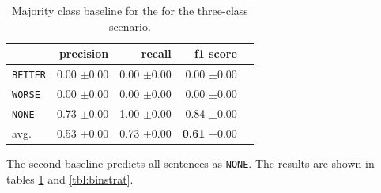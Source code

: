 \begin{table}[!htb]
\begin{minipage}{.5\linewidth}
	\end{minipage}%
	\begin{minipage}{.5\linewidth}
		\centering
		\caption{Majority class baseline for the  for the three-class scenario.}
		\label{tbl:3majoritybaseline}
		\begin{tabularx}{0.97\linewidth}{Xrrrr}
			\toprule
			                & precision                    & recall                       & f1 score                                    \\ \midrule 
			\texttt{BETTER} & 0.00 \scriptsize{$\pm$0.00} & 0.00 \scriptsize{$\pm$0.00} & 0.00 \scriptsize{$\pm$0.00}                \\ 
			\texttt{WORSE}  & 0.00 \scriptsize{$\pm$0.00} & 0.00 \scriptsize{$\pm$0.00} & 0.00 \scriptsize{$\pm$0.00}                \\ 
			\texttt{NONE}   & 0.73 \scriptsize{$\pm$0.00}     & 1.00 \scriptsize{$\pm$0.00} & 0.84 \scriptsize{$\pm$0.00}                \\ 
			avg.         & 0.53 \scriptsize{$\pm$0.00} & 0.73 \scriptsize{$\pm$0.00} & \textbf{0.61} \scriptsize{$\pm$0.00} \\ 
			\bottomrule
		\end{tabularx}
	\end{minipage} 
\end{table}


The second baseline predicts all sentences as \texttt{NONE}. The results are shown in tables \ref{tbl:3majoritybaseline} and \ref{tbl:binstrat}.



